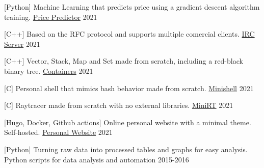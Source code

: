 
\begin{cventries}

  \cventry
    {[Python] Machine Learning that predicts price using a gradient descent algorithm training.}
    {\href{https://github.com/pruiz-ca/ft_linear_regression}{Price Predictor}}
    {}
    {2021}
    {}

  \cventry
    {[C++] Based on the RFC protocol and supports multiple comercial clients.}
    {\href{https://github.com/pruiz-ca/ft_irc}{IRC Server}}
    {}
    {2021}
    {}

  \cventry
    {[C++] Vector, Stack, Map and Set made from scratch, including a red-black binary tree.}
    {\href{https://github.com/pruiz-ca/ft_irc}{Containers}}
    {}
    {2021}
    {}

  \cventry
    {[C] Personal shell that mimics bash behavior made from scratch.}
    {\href{https://github.com/pruiz-ca/minishell}{Minishell}}
    {}
    {2021}
    {}

  \cventry
    {[C] Raytracer made from scratch with no external libraries.}
    {\href{https://github.com/pruiz-ca/miniRT}{MiniRT}}
    {}
    {2021}
    {}

  \cventry
    {[Hugo, Docker, Github actions] Online personal website with a minimal theme. Self-hosted.}
    {\href{https://github.com/pruiz-ca/pedroruiz.xyz}{Personal Website}}
    {}
    {2021}
    {}

  \cventry
    {[Python] Turning raw data into processed tables and graphs for easy analysis.}
    {Python scripts for data analysis and automation}
    {}
    {2015-2016}
    {}

\end{cventries}
